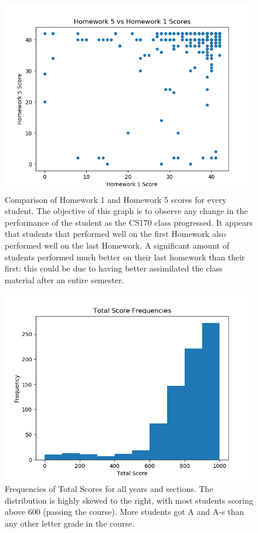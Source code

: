\documentclass[12pt,letterpaper]{article}
\begin{document}
\begin{figure}[!htb]
  \includegraphics[width=\linewidth]{graph3.png}
  \caption{Comparison of Homework 1 and Homework 5 scores for every student. The objective of this graph is to observe any change in the performance of the student as the CS170 class progressed. It appears that students that performed well on the first Homework also performed well on the last Homework. A significant amount of students performed much better on their last homework than their first: this could be due to having better assimilated the class material after an entire semester.}
\end{figure}

\begin{figure}[!htb]
  \includegraphics[width=\linewidth]{graph4.png}
  \caption{Frequencies of Total Scores for all years and sections. The distribution is highly skewed to the right, with most students scoring above 600 (passing the course). More students got A and A-s than any other letter grade in the course.}
\end{figure}
\end{document}
